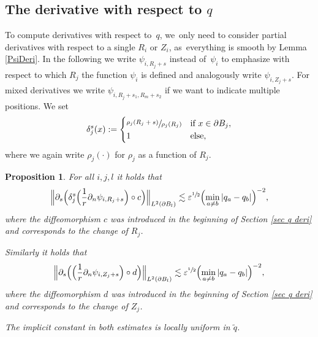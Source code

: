 \documentclass[10pt]{amsart}
\let\epsilon\varepsilon
\newtheorem{proposition}[theorem]{Proposition}
\theoremstyle{definition}
\newcommand\Bnorm[1]{\Bigl\lVert #1\Bigr\rVert}
\let\de\partial
\let\eps\epsilon
\begin{document}
\subsection{The derivative with respect to $q$}
To compute derivatives with respect to~$q$, we~only need to consider partial derivatives with respect to a single $R_i$ or $Z_i$, as~everything is smooth by Lemma \ref{PsiDeri}.
In the following we write $\psi_{i,R_j+s}$ instead of~$\psi_i$ to emphasize with respect to which $R_j$ the function $\psi_i$ is defined and analogously write $\psi_{i,Z_j+s}$. For mixed derivatives we write $\psi_{i,R_j+s_1,R_m+s_2}$ if we want to indicate multiple positions.
We set
\begin{align*}
\delta_{j}^s(x):=\begin{cases}
\sfrac{\rho_j(R_j+s)}{\rho_j(R_j)}& \text{if } x\in \de B_j,\\
1 & \text{else,}
\end{cases}
\end{align*}
where we again write $\rho_j(\cdot)$ for $\rho_j$ as a function of $R_j$.

\begin{proposition}\label{deri mu}
For all $i,j,l$ it holds that
\begin{align*}
\Bnorm{\de_s\Bigl(\delta_j^s\Bigl(\frac{1}{r}\de_n\psi_{i,R_j+s}\Bigr)\circ c\Bigr)}_{L^2(\de B_l)}\lesssim \eps^{\sfrac{1}{2}}\Bigl(\min_{a\neq b}|q_a-q_b|\Bigr)^{-2},
\end{align*}
where the diffeomorphism $c$ was introduced in the beginning of Section \ref{sec q deri} and corresponds to the change of $R_j$.

Similarly it holds that
\begin{align*}
\Bnorm{\de_s\Bigl(\Bigl(\frac{1}{r}\de_n\psi_{i,Z_j+s}\Bigr)\circ d\Bigr)}_{L^2(\de B_l)}\lesssim \eps^{\sfrac{1}{2}}\Bigl(\min_{a\neq b}|q_a-q_b|\Bigr)^{-2},
\end{align*}
where the diffeomorphism $d$ was introduced in the beginning of Section \ref{sec q deri} and corresponds to the change of $Z_j$.

The implicit constant in both estimates is locally uniform in $\tilde{q}$.
\end{proposition}
\end{document}
